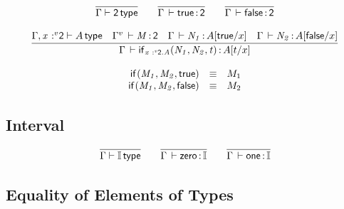 \documentclass[11pt]{article}
\theoremstyle{plain}
\begin{document}
\[
\begin{array}{c}
\infer{\wftp{\Gamma}{\bool}}
      {}
\qquad
\infer{\oftp{\Gamma}{\dsd{true}}{\bool}}{}
\qquad
\infer{\oftp{\Gamma}{\dsd{false}}{\bool}}{}
\\ \\
\infer{\oftp{\Gamma}{\ite{\vstptm{x}{v}{\dsd{2}}.A}{N_1}{N_2}{t}}{\subst{A}{t}{x}}}
      {\wftp{\Gamma,\vstptm{x}{v}{\dsd{2}}}{A} &
        \oftp{\Gamma^v}{M}{\dsd{2}} &
        \oftp{\Gamma}{N_1}{\subst{A}{\dsd{true}}{x}} &
        \oftp{\Gamma}{N_2}{\subst{A}{\dsd{false}}{x}}
      }
\\ \\
\begin{array}{rcll}
\ite{}{M_1}{M_2}{\dsd{true}} & \equiv & M_1 \\
\ite{}{M_1}{M_2}{\dsd{false}} & \equiv & M_2 \\
\end{array} \\
\end{array}
\]

\subsection{Interval}

\[
\begin{array}{c}
\infer{\wftp{\Gamma}{\I}}
      {}
\qquad
\infer{\oftp{\Gamma}{\Iz}{\I}}{}
\qquad
\infer{\oftp{\Gamma}{\Io}{\I}}{}
\end{array}
\]


\subsection{Equality of Elements of Types}

\end{document}
